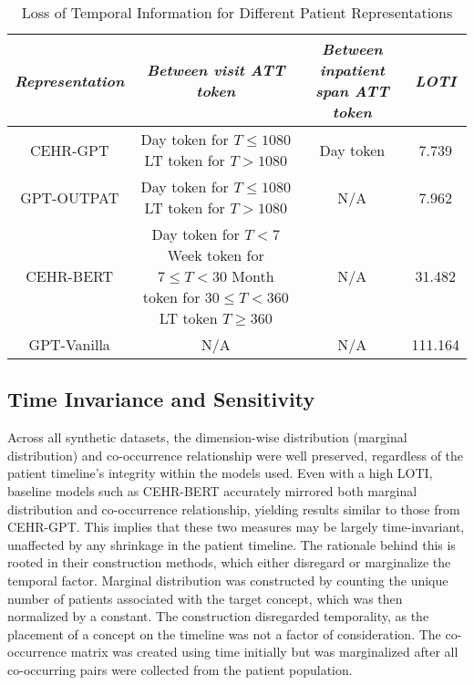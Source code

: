 \begin{multicols}{2}
\begingroup
\setlength{\tabcolsep}{6pt} %
\renewcommand{\arraystretch}{2} %
\begin{table*}[t]
  \centering
  \begin{tabular}{cccc}
  \toprule 
  \textit{Representation}  & \textit{Between visit ATT token} & \textit{Between inpatient span ATT token} & \textit{LOTI}\\
  \midrule
    CEHR-GPT & \makecell{\\Day token for $T \leq 1080$ \\ LT token for $T > 1080$ \\\\} & Day token & 7.739 \\
    GPT-OUTPAT & \makecell{Day token for $T \leq 1080$ \\ LT token for $T > 1080$ \\\\} & N/A & 7.962 \\
    CEHR-BERT &   \makecell{Day token for $T < 7$ \\ Week token for $7 \leq T < 30$ \\ Month token for $30 \leq T < 360$ \\ LT token $T \geq 360$}   &  N/A & 31.482 \\
    GPT-Vanilla & N/A & N/A & 111.164 \\
    \hline
  \end{tabular}
  \caption{Loss of Temporal Information for Different Patient Representations}
  \label{tab:loti}
\end{table*}
\endgroup

\subsection{Time Invariance and Sensitivity}
Across all synthetic datasets, the dimension-wise distribution (marginal distribution) and co-occurrence relationship were well preserved, regardless of the patient timeline's integrity within the models used. Even with a high LOTI, baseline models such as CEHR-BERT accurately mirrored both marginal distribution and co-occurrence relationship, yielding results similar to those from CEHR-GPT. This implies that these two measures may be largely time-invariant, unaffected by any shrinkage in the patient timeline. The rationale behind this is rooted in their construction methods, which either disregard or marginalize the temporal factor. Marginal distribution was constructed by counting the unique number of patients associated with the target concept, which was then normalized by a constant. The construction disregarded temporality, as the placement of a concept on the timeline was not a factor of consideration. The co-occurrence matrix was created using time initially but was marginalized after all co-occurring pairs were collected from the patient population. 


\end{multicols}

